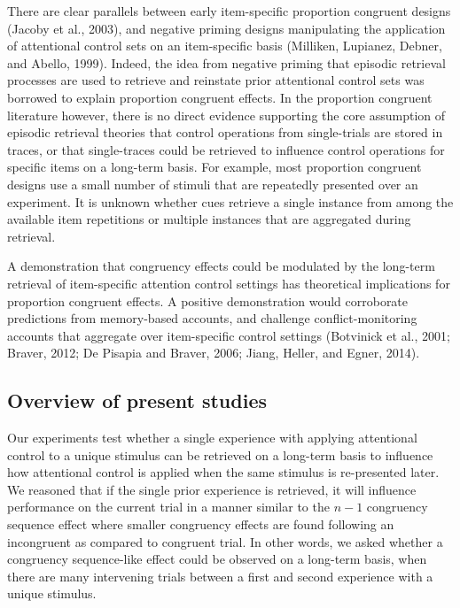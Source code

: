 \documentclass[]{DissertateCUNY}
\begin{document}
There are clear parallels between early item-specific proportion
congruent designs (Jacoby et al., 2003), and negative priming designs
manipulating the application of attentional control sets on an
item-specific basis (Milliken, Lupianez, Debner, and Abello, 1999).
Indeed, the idea from negative priming that episodic retrieval processes
are used to retrieve and reinstate prior attentional control sets was
borrowed to explain proportion congruent effects. In the proportion
congruent literature however, there is no direct evidence supporting the
core assumption of episodic retrieval theories that control operations
from single-trials are stored in traces, or that single-traces could be
retrieved to influence control operations for specific items on a
long-term basis. For example, most proportion congruent designs use a
small number of stimuli that are repeatedly presented over an
experiment. It is unknown whether cues retrieve a single instance from
among the available item repetitions or multiple instances that are
aggregated during retrieval.

A demonstration that congruency effects could be modulated by the
long-term retrieval of item-specific attention control settings has
theoretical implications for proportion congruent effects. A positive
demonstration would corroborate predictions from memory-based accounts,
and challenge conflict-monitoring accounts that aggregate over
item-specific control settings (Botvinick et al., 2001; Braver, 2012; De
Pisapia and Braver, 2006; Jiang, Heller, and Egner, 2014).

\hypertarget{overview-of-present-studies}{%
\subsection{Overview of present
studies}\label{overview-of-present-studies}}

Our experiments test whether a single experience with applying
attentional control to a unique stimulus can be retrieved on a long-term
basis to influence how attentional control is applied when the same
stimulus is re-presented later. We reasoned that if the single prior
experience is retrieved, it will influence performance on the current
trial in a manner similar to the \(n-1\) congruency sequence effect
where smaller congruency effects are found following an incongruent as
compared to congruent trial. In other words, we asked whether a
congruency sequence-like effect could be observed on a long-term basis,
when there are many intervening trials between a first and second
experience with a unique stimulus.
\end{document}
